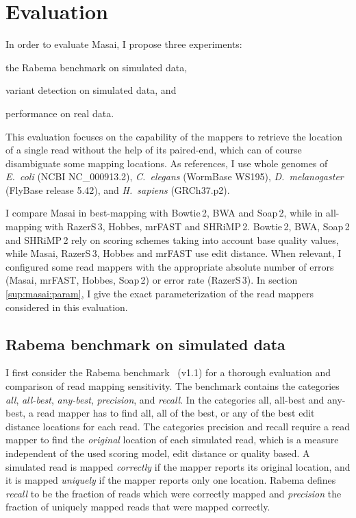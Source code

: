 
\section{Evaluation}
\label{masai:evaluation}

In order to evaluate Masai, I propose three experiments:
\begin{inparaenum}[(i)]
\item the Rabema benchmark on simulated data,
\item variant detection on simulated data, and 
\item performance on real data.
\end{inparaenum}
This evaluation focuses on the capability of the mappers to retrieve the location of a single read without the help of its paired-end, which can of course disambiguate some mapping locations.
As references, I use whole genomes of \emph{E.~coli} (NCBI NC\_000913.2), \emph{C.~elegans} (WormBase WS195), \emph{D.~melanogaster} (FlyBase release 5.42), and \emph{H.~sapiens} (GRCh37.p2).

I compare Masai in best-mapping with Bowtie\,2, BWA and Soap\,2, while in all-mapping with RazerS\,3, Hobbes, mrFAST and SHRiMP\,2.
Bowtie\,2, BWA, Soap\,2 and SHRiMP\,2 rely on scoring schemes taking into account base quality values, while Masai, RazerS\,3, Hobbes and mrFAST use edit distance.
When relevant, I configured some read mappers with the appropriate absolute number of errors (Masai, mrFAST, Hobbes, Soap\,2) or error rate (RazerS\,3).
In section \ref{sup:masai:param}, I give the exact parameterization of the read mappers considered in this evaluation.

\subsection{Rabema benchmark on simulated data}
\label{masai:evaluation:rabema}

I first consider the Rabema benchmark~\citep{Holtgrewe2011} (v1.1) for a thorough evaluation and comparison of read mapping sensitivity.
The benchmark contains the categories \emph{all}, \emph{all-best}, \emph{any-best}, \emph{precision}, and \emph{recall}.
In the categories all, all-best and any-best, a read mapper has to find all, all of the best, or any of the best edit distance locations for each read.
The categories precision and recall require a read mapper to find the \emph{original} location of each simulated read, which is a measure independent of the used scoring model, \eg edit distance or quality based.
A simulated read is mapped \emph{correctly} if the mapper reports its original location, 
and it is mapped \emph{uniquely} if the mapper reports only one location.
Rabema defines \emph{recall} to be the fraction of reads which were correctly mapped and \emph{precision} the fraction of uniquely mapped reads that were mapped correctly.


